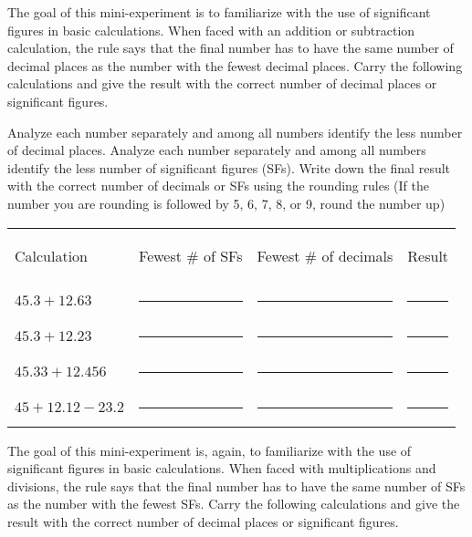 \documentclass[main.tex]{subfiles}
\begin{document}
\vspace{0.2cm}{\large \bfseries 1. Significant figures in additions and subtractions}
The goal of this mini-experiment is to familiarize with the use of significant figures in basic calculations. When faced with an addition or subtraction calculation, the rule says that the final number has to have the same number of decimal places as the number with the fewest decimal places. Carry the following calculations and give the result with the correct number of decimal places or significant figures.

\begin{steps}
    \newstep[] Analyze each number separately and among all numbers identify the less number of decimal places.
    \newstep[] Analyze each number separately and among all numbers identify the less number of significant figures (SFs). 
    \newstep[]Write down the final result with the correct number of decimals or SFs using the rounding rules (If the number you are rounding is followed by 5, 6, 7, 8, or 9, round the number up)
\end{steps}

\begin{center} \begin{tabular}{ p{5cm} p{3cm} p{3cm}p{3cm}   }
   \begin{bf}Calculation\end{bf} & \begin{bf}Fewest \# of SFs\end{bf} &\begin{bf}Fewest \# of decimals\end{bf} &\begin{bf}Result\end{bf} \\[0.1cm]     
  $45.3+12.63$ 				&\rule{3cm}{0.4pt}&\rule{3cm}{0.4pt}&\rule{3cm}{0.4pt}  \\[0.2cm]      
  $45.3+12.23$ 				&\rule{3cm}{0.4pt}&\rule{3cm}{0.4pt}&\rule{3cm}{0.4pt}  \\[0.2cm]      
   $45.33+12.456$  				&\rule{3cm}{0.4pt}&\rule{3cm}{0.4pt}&\rule{3cm}{0.4pt}  \\[0.2cm]      
  $45+12.12-23.2$  				&\rule{3cm}{0.4pt}&\rule{3cm}{0.4pt}&\rule{3cm}{0.4pt}  \\[0.2cm]      
 \end{tabular}\end{center}


\vspace{0.2cm}{\large \bfseries 2. Significant figures in multiplications and divisions}
The goal of this mini-experiment is, again, to familiarize with the use of significant figures in basic calculations. When faced with multiplications and divisions, the rule says that the final number has to have the same number of SFs as the number with the fewest SFs. Carry the following calculations and give the result with the correct number of decimal places or significant figures.
\end{document}
